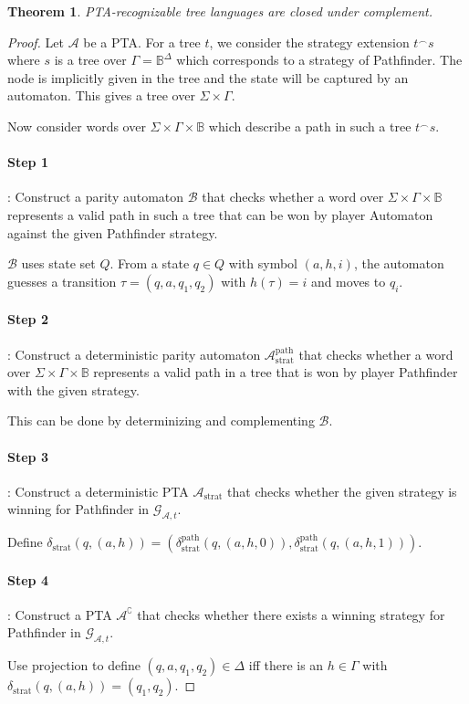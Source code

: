 \documentclass{article}
\newtheorem{theorem}{Theorem}
\begin{document}
\vspace{0.25cm}
\begin{theorem}
\label{pta_complement}
	PTA-recognizable tree languages are closed under complement.
\end{theorem}
\begin{proof} Let $\mathcal{A}$ be a PTA. For a tree $t$, we consider the strategy extension $t^\smallfrown s$ where $s$ is a tree over $\Gamma = \mathbb{B}^\Delta$ which corresponds to a strategy of Pathfinder. The node is implicitly given in the tree and the state will be captured by an automaton. This gives a tree over $\Sigma \times \Gamma$.

	Now consider words over $\Sigma \times \Gamma \times \mathbb{B}$ which describe a path in such a tree $t^\smallfrown s$.

	\paragraph{Step 1}: Construct a parity automaton $\mathcal{B}$ that checks whether a word over $\Sigma \times \Gamma \times \mathbb{B}$ represents a valid path in such a tree that can be won by player Automaton against the given Pathfinder strategy.
	
	$\mathcal{B}$ uses state set $Q$. From a state $q \in Q$ with symbol $(a, h, i)$, the automaton guesses a transition $\tau = (q, a, q_1, q_2)$ with $h(\tau) = i$ and moves to $q_i$.
	
	\paragraph{Step 2}: Construct a deterministic parity automaton $\mathcal{A}_\text{strat}^\text{path}$ that checks whether a word over $\Sigma \times \Gamma \times \mathbb{B}$ represents a valid path in a tree that is won by player Pathfinder with the given strategy.
	
	This can be done by determinizing and complementing $\mathcal{B}$.
	
	\paragraph{Step 3}: Construct a deterministic PTA $\mathcal{A}_\text{strat}$ that checks whether the given strategy is winning for Pathfinder in $\mathcal{G}_{\mathcal{A},t}$.
	
	Define $\delta_\text{strat}(q, (a, h)) = (\delta_\text{strat}^\text{path}(q, (a, h, 0)), \delta_\text{strat}^\text{path}(q, (a, h, 1)))$.
	
	\paragraph{Step 4}: Construct a PTA $\mathcal{A}^\complement$ that checks whether there exists a winning strategy for Pathfinder in $\mathcal{G}_{\mathcal{A},t}$.
	
	Use projection to define $(q, a, q_1, q_2) \in \Delta$ iff there is an $h \in \Gamma$ with $\delta_\text{strat}(q, (a, h)) = (q_1, q_2)$.
\end{proof}
\end{document}
